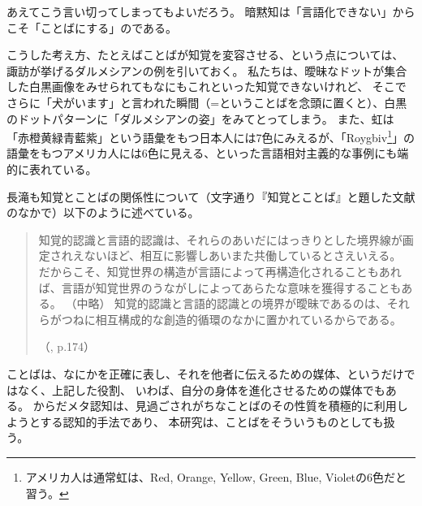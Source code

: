 あえてこう言い切ってしまってもよいだろう。
暗黙知\cite{polanyi:1966}は「言語化できない」からこそ「ことばにする」のである。

こうした考え方、たとえばことばが知覚を変容させる、という点については、
諏訪\cite{suwa:2016}が挙げるダルメシアンの例を引いておく。
私たちは、曖昧なドットが集合した白黒画像をみせられてもなにもこれといった知覚できないけれど、
そこでさらに「犬がいます」と言われた瞬間（=ということばを念頭に置くと）、白黒のドットパターンに「ダルメシアンの姿」をみてとってしまう。
また、虹は「赤橙黄緑青藍紫」という語彙をもつ日本人には7色にみえるが、「Roygbiv\footnote{
アメリカ人は通常虹は、Red, Orange, Yellow, Green, Blue, Violetの6色だと習う。
}」の語彙をもつアメリカ人には6色に見える、といった言語相対主義的な事例にも端的に表れている。

長滝\cite{nagataki:1999}も知覚とことばの関係性について（文字通り『知覚とことば』と題した文献のなかで）以下のように述べている。
\begin{quote}
  知覚的認識と言語的認識は、それらのあいだにはっきりとした境界線が画定されえないほど、相互に影響しあいまた共働しているとさえいえる。
だからこそ、知覚世界の構造が言語によって再構造化されることもあれば、言語が知覚世界のうながしによってあらたな意味を獲得することもある。
（中略）
知覚的認識と言語的認識との境界が曖昧であるのは、それらがつねに相互構成的な創造的循環のなかに置かれているからである。

（\cite{nagataki:1999}, p.174）
\end{quote}

ことばは、なにかを正確に表し、それを他者に伝えるための媒体、というだけではなく、上記した役割、
いわば、自分の身体を進化させるための媒体でもある。
からだメタ認知は、見過ごされがちなことばのその性質を積極的に利用しようとする認知的手法であり、
本研究は、ことばをそういうものとしても扱う。




